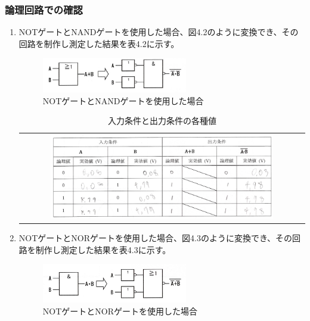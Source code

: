 \documentclass{jlreq}
\numberwithin{equation}{section}
\begin{document}
\subsubsection{論理回路での確認}
\begin{enumerate}
  \item NOTゲートとNANDゲートを使用した場合、図4.2のように変換でき、その回路を制作し測定した結果を表4.2に示す。
  
  \begin{figure}[H]
  \centering
  \includegraphics[width=0.6\textwidth]{assets/notnand.png}
  \caption{NOTゲートとNANDゲートを使用した場合}
  \end{figure}

  \begin{table}[H]
  \centering
  \caption{入力条件と出力条件の各種値}
  \begin{tabular}{c}
    \includegraphics[width=0.8\textwidth]{assets/notnandshinri.png} \\
  \end{tabular}
  \end{table}

  \item NOTゲートとNORゲートを使用した場合、図4.3のように変換でき、その回路を制作し測定した結果を表4.3に示す。
  
  \begin{figure}[H]
  \centering
  \includegraphics[width=0.6\textwidth]{assets/notnor.png}
  \caption{NOTゲートとNORゲートを使用した場合}
  \end{figure}


\end{enumerate}
\end{document}
